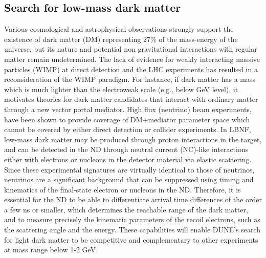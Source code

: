  \subsection{Search for low-mass dark matter}
 Various cosmological and astrophysical observations strongly support the existence of dark matter
(DM) representing 27\% of the mass-energy of the universe, but its nature and potential non
gravitational interactions with regular matter remain undetermined. The lack of evidence for
 weakly interacting massive particles (WIMP) at direct detection and the LHC experiments has
 resulted in a reconsideration of the WIMP paradigm. For instance, if dark matter has a mass
 which is much lighter than the electroweak scale (e.g., below GeV level), it motivates theories for
 dark matter candidates that interact with ordinary matter through a new vector portal mediator.
 High flux (neutrino) beam experiments,  have been shown to provide coverage of
DM+mediator parameter space which cannot be covered by either direct detection or collider
 experiments. In LBNF, low-mass dark matter may be produced through proton interactions in
the target, and can be detected in the ND through neutral current (NC)-like interactions either
 with electrons or nucleons in the detector material via elastic scattering. Since these experimental
 signatures are virtually identical to those of neutrinos, neutrinos are a significant background that
 can be suppressed using timing and kinematics of the final-state electron or nucleons in the ND.
Therefore, it is essential for the ND to be able to differentiate arrival time differences of the order
 a few ns or smaller, which determines the reachable range of the dark matter, and to measure
 precisely the kinematic parameters of the recoil electrons, such as the scattering angle and the
energy. These capabilities will enable DUNE's search for light dark matter to be competitive and
 complementary to other experiments at mass range below 1-2 GeV. 

